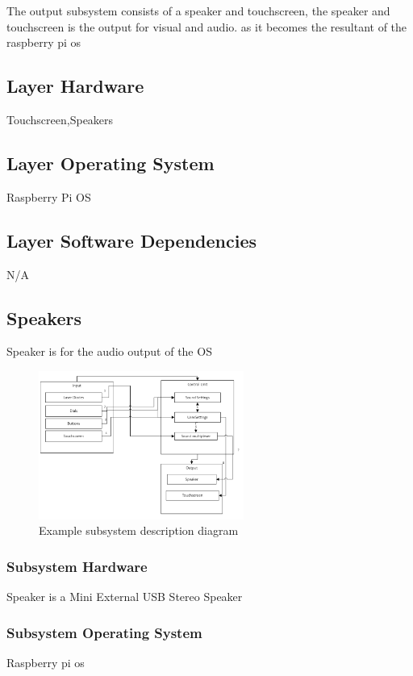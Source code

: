 The output subsystem consists of a speaker and touchscreen, the speaker and touchscreen is the output for visual and audio. as it becomes the resultant of the raspberry pi os

\subsection{Layer Hardware}
Touchscreen,Speakers

\subsection{Layer Operating System}
Raspberry Pi OS

\subsection{Layer Software Dependencies}
N/A

\subsection{Speakers}
Speaker is for the audio output of the OS

\begin{figure}[h!]
	\centering
 	\includegraphics[width=0.60\textwidth]{images/subsystem}
 \caption{Example subsystem description diagram}
\end{figure}

\subsubsection{Subsystem Hardware}
Speaker is a Mini External USB Stereo Speaker

\subsubsection{Subsystem Operating System}
Raspberry pi os

